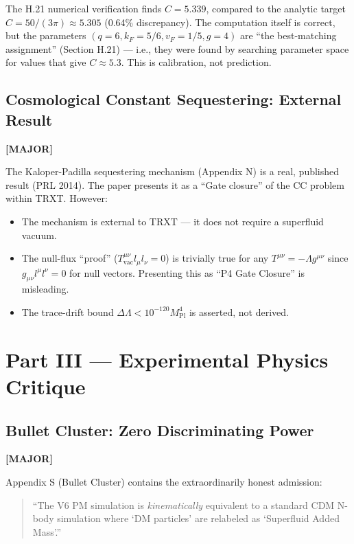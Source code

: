 \documentclass[12pt, a4paper]{article}
\newcommand{\major}{\textcolor{major}{\textbf{[MAJOR]}}}
\begin{document}
The H.21 numerical verification finds $C = 5.339$, compared to the analytic target $C = 50/(3\pi) \approx 5.305$ (0.64\% discrepancy). The computation itself is correct, but the parameters $(q = 6, k_F = 5/6, v_F = 1/5, g = 4)$ are ``the best-matching assignment'' (Section H.21) --- i.e., they were found by searching parameter space for values that give $C \approx 5.3$. This is calibration, not prediction.

\subsection{Cosmological Constant Sequestering: External Result}
\major{}

The Kaloper-Padilla sequestering mechanism (Appendix N) is a real, published result (PRL 2014). The paper presents it as a ``Gate closure'' of the CC problem within TRXT. However:
\begin{itemize}
    \item The mechanism is external to TRXT --- it does not require a superfluid vacuum.
    \item The null-flux ``proof'' ($T^{\mu\nu}_{\text{vac}} l_\mu l_\nu = 0$) is trivially true for any $T^{\mu\nu} = -\Lambda g^{\mu\nu}$ since $g_{\mu\nu} l^\mu l^\nu = 0$ for null vectors. Presenting this as ``P4 Gate Closure'' is misleading.
    \item The trace-drift bound $\Delta\Lambda < 10^{-120} M_{\text{Pl}}^4$ is asserted, not derived.
\end{itemize}

\section{Part III --- Experimental Physics Critique}

\subsection{Bullet Cluster: Zero Discriminating Power}
\major{}

Appendix S (Bullet Cluster) contains the extraordinarily honest admission:
\begin{quote}
    ``The V6 PM simulation is \emph{kinematically} equivalent to a standard CDM N-body simulation where `DM particles' are relabeled as `Superfluid Added Mass'.''
\end{quote}
\end{document}
